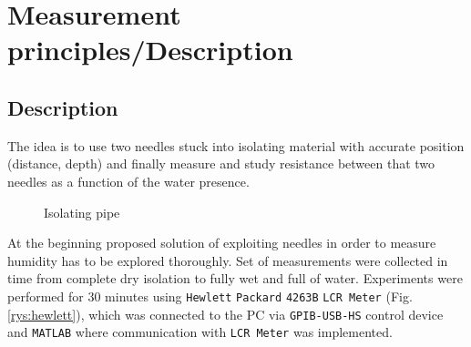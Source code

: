 \documentclass[a4paper, keeplastbox]{jacow}
\def\figurename{Fig.}
\begin{document}
\section{Measurement principles/Description}
\subsection{Description}

The idea is to use two needles stuck into isolating material with accurate position (distance, depth) and finally measure and study resistance between that two needles as a function of the water presence.
\begin{figure}[H]
	\begin{center}
	\end{center}
	\caption{Isolating pipe}
	\label{rys:pipe}
\end{figure}

At the beginning proposed solution of exploiting needles in order to measure humidity has to be explored thoroughly. Set of measurements were collected in time from complete dry isolation to fully wet and full of water. Experiments were performed for 30 minutes using \verb|Hewlett| \verb|Packard| \verb|4263B| \verb|LCR Meter| (\figurename{} \ref{rys:hewlett}), which was connected to the PC via \verb|GPIB-USB-HS| control device and \verb|MATLAB| where communication with \verb|LCR Meter| was implemented.
\end{document}
